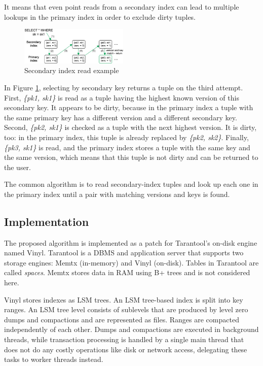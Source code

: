 \documentclass{vldb}
\begin{document}
It means that even point reads from a secondary index can lead to multiple
lookups in the primary index in order to exclude dirty tuples.
\begin{figure}
\centering
\includegraphics[width=0.46\textwidth]{secondary_reading_example}
\caption{Secondary index read example}
\label{fig:secondary_reading_example}
\end{figure}
In Figure \ref{fig:secondary_reading_example}, selecting by secondary key
returns a tuple on the third attempt. First, \textit{\{pk1, sk1\}} is read as a tuple having
the highest known version of this secondary key. It appears to be dirty, because
in the primary index a tuple with the same primary key has a different version and
a different secondary key. Second, \textit{\{pk2, sk1\}} is checked as a tuple with
the next highest version. It is dirty, too: in the primary index, this tuple is already
replaced by \textit{\{pk2, sk2\}}. Finally, \textit{\{pk3, sk1\}} is read, and the
primary index stores a tuple with the same key and the same version, which means
that this tuple is not dirty and can be returned to the user.

The common algorithm is to read secondary-index tuples and look up each one in the
primary index until a pair with matching versions and keys is found.

\subsection{Implementation}

The proposed algorithm is implemented as a patch for Tarantool's on-disk
engine named Vinyl. Tarantool is a DBMS and application server that supports two
storage engines: Memtx (in-memory) and Vinyl (on-disk). Tables in Tarantool are
called \textit{spaces}. Memtx stores data in RAM using B+ trees and is not
considered here.

Vinyl stores indexes as LSM trees. An LSM tree-based index is split into key
ranges. An LSM tree level consists of sublevels that are produced by level zero dumps and
compactions and are represented as files. Ranges are compacted independently of each
other. Dumps and compactions are executed in background threads, while transaction
processing is handled by a single main thread that does not do any costly operations like disk
or network access, delegating these tasks to worker threads instead.
\end{document}
